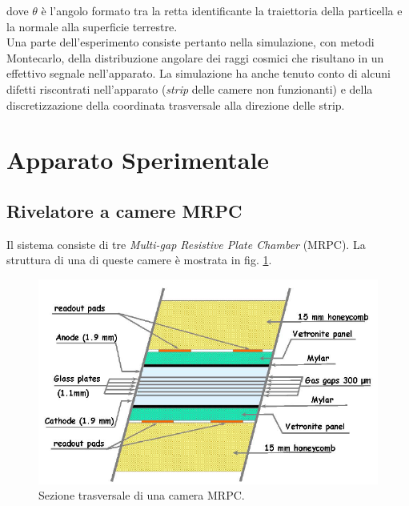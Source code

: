 \documentclass[8pt]{extarticle}
\begin{document}
dove $\theta$ è l'angolo formato tra la retta identificante la traiettoria della particella e la normale alla superficie terrestre. \\

Una parte dell'esperimento consiste pertanto nella simulazione, con metodi Montecarlo, della distribuzione angolare dei raggi cosmici che risultano in un effettivo segnale nell'apparato. La simulazione ha anche tenuto conto di alcuni difetti riscontrati nell'apparato (\textit{strip} delle camere non funzionanti) e della discretizzazione della coordinata trasversale alla direzione delle strip. \\

\section{Apparato Sperimentale}
\subsection{Rivelatore a camere MRPC}
Il sistema consiste di tre \textit{Multi-gap Resistive Plate Chamber} (MRPC). La struttura di una di queste camere è mostrata in fig. \ref{fig:mrpc}. \\

\begin{figure}
\begin{center}
\includegraphics[scale=0.3]{mrpc}
\caption{Sezione trasversale di una camera MRPC.}
\label{fig:mrpc}
\end{center}
\end{figure}
\end{document}
